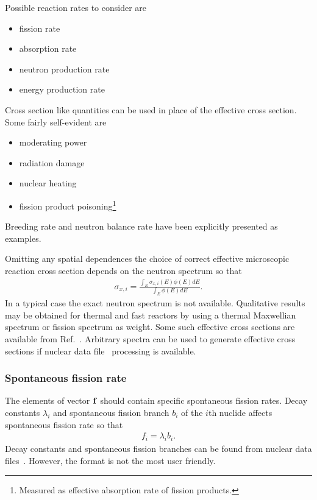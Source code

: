 Possible reaction rates to consider are
\begin{itemize}\setlength{\itemsep}{-1mm}
	\item fission rate
	\item absorption rate
	\item neutron production rate
	\item energy production rate
\end{itemize}

Cross section like quantities can be used in place of the effective cross section. Some fairly self-evident are
\begin{itemize}\setlength{\itemsep}{-1mm}
	\item moderating power
	\item radiation damage
	\item nuclear heating
	\item fission product poisoning\footnote{Measured as effective absorption rate of fission products.}
\end{itemize}
Breeding rate and neutron balance rate have been explicitly presented as examples.

Omitting any spatial dependences the choice of correct effective microscopic reaction cross section depends on the neutron spectrum so that
%
\begin{gather}
\sigma_{x,i} = \frac{\int_E\sigma_{x,i}(E)\phi(E)dE}{\int_E\phi(E)dE}.
\end{gather}
%
In a typical case the exact neutron spectrum is not available. Qualitative results may be obtained for thermal and fast reactors by using a thermal Maxwellian spectrum or fission spectrum as weight. Some such effective cross sections are available from Ref.~\cite{nndc}. Arbitrary spectra can be used to generate effective cross sections if nuclear data file~\cite{jendl,jeff,cendl,brond,endf} processing is available.

\subsubsection*{Spontaneous fission rate}

The elements of vector $\mathbf{f}$ should contain specific spontaneous fission rates. Decay constants $\lambda_i$ and spontaneous fission branch $b_i$ of the $i$th nuclide affects spontaneous fission rate so that
%
\begin{gather}
f_i = \lambda_ib_i.
\end{gather}
%
Decay constants and spontaneous fission branches can be found from nuclear data files~\cite{jendl,jeff,cendl,brond,endf}. However, the format is not the most user friendly.



